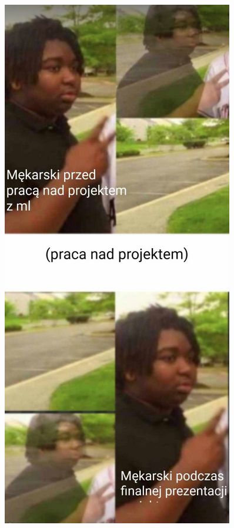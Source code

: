 \documentclass[aspectratio=169]{beamer}
\begin{document}
\begin{frame}
\centering
\includegraphics[height = \textheight]{images/michal.png}
\end{frame}
\end{document}
